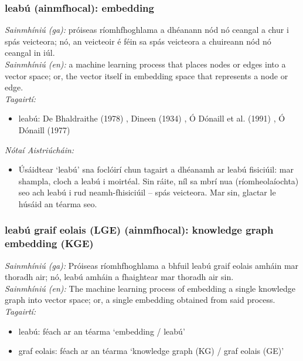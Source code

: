 \documentclass{article}
\begin{document}
\subsubsection*{leabú (ainmfhocal): embedding}
 \noindent \textit{Sainmhíniú (ga):} próiseas ríomhfhoghlama a dhéanann nód nó ceangal a chur i spás veicteora; nó, an veicteoir é féin sa spás veicteora a chuireann nód nó ceangal in iúl.
\\
 \noindent \textit{Sainmhíniú (en):} a machine learning process that places nodes or edges into a vector space; or, the vector itself in embedding space that represents a node or edge.
\\
 \noindent \textit{Tagairtí:}
\begin{itemize}
	\item leabú: De Bhaldraithe (1978) \cite{de-bhaldraithe}, Dineen (1934) \cite{dineen}, Ó Dónaill et al. (1991) \cite{focloir-beag}, Ó Dónaill (1977) \cite{odonaill}
\end{itemize}

 \noindent \textit{Nótaí Aistriúcháin:}
\begin{itemize}
	\item Úsáidtear `leabú' sna foclóirí chun tagairt a dhéanamh ar leabú fisiciúil: mar shampla, cloch a leabú i moirtéal. Sin ráite, níl sa mbrí nua (ríomheolaíochta) seo ach leabú i rud neamh-fhisiciúil -- spás veicteora. Mar sin, glactar le húsáid an téarma seo.
\end{itemize}


\subsubsection*{leabú graif eolais (LGE) (ainmfhocal): knowledge graph embedding (KGE)}
 \noindent \textit{Sainmhíniú (ga):} Próiseas ríomhfhoghlama a bhfuil leabú graif eolais amháin mar thoradh air; nó, leabú amháin a fhaightear mar thoradh air sin.
\\
 \noindent \textit{Sainmhíniú (en):} The machine learning process of embedding a single knowledge graph into vector space; or, a single embedding obtained from said process.
\\
 \noindent \textit{Tagairtí:}
\begin{itemize}
	\item leabú: féach ar an téarma `embedding / leabú'
	\item graf eolais: féach ar an téarma `knowledge graph (KG) / graf eolais (GE)'
\end{itemize}
\end{document}
